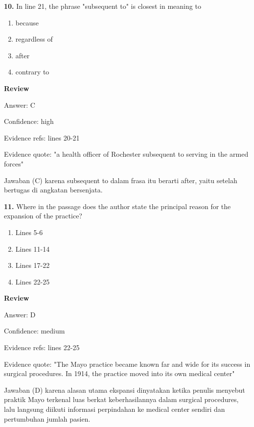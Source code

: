 \documentclass[12pt]{article}
\begin{document}
\endgroup
\par
\vspace{0.25\baselineskip}
\noindent\textbf{10.} In line 21, the phrase "subsequent to" is closest in meaning to
\begin{enumerate}[label=(\Alph*),leftmargin=*,itemsep=0.2em]
\item because
\item regardless of
\item after
\item contrary to
\end{enumerate}
\par
\begingroup
\setlength{\parskip}{0pt}
\setlength{\parindent}{0pt}
\textbf{Review}\par
Answer: C\par
Confidence: high\par
Evidence refs: lines 20-21\par
Evidence quote: "a health officer of Rochester subsequent to serving in the armed forces"\par
Jawaban (C) karena subsequent to dalam frasa itu berarti after, yaitu setelah bertugas di angkatan bersenjata.\par
\endgroup
\par
\vspace{0.25\baselineskip}
\noindent\textbf{11.} Where in the passage does the author state the principal reason for the expansion of the practice?
\begin{enumerate}[label=(\Alph*),leftmargin=*,itemsep=0.2em]
\item Lines 5-6
\item Lines 11-14
\item Lines 17-22
\item Lines 22-25
\end{enumerate}
\par
\begingroup
\setlength{\parskip}{0pt}
\setlength{\parindent}{0pt}
\textbf{Review}\par
Answer: D\par
Confidence: medium\par
Evidence refs: lines 22-25\par
Evidence quote: "The Mayo practice became known far and wide for its success in surgical procedures. In 1914, the practice moved into its own medical center"\par
Jawaban (D) karena alasan utama ekspansi dinyatakan ketika penulis menyebut praktik Mayo terkenal luas berkat keberhasilannya dalam surgical procedures, lalu langsung diikuti informasi perpindahan ke medical center sendiri dan pertumbuhan jumlah pasien.\par
\endgroup
\par
\vspace{0.25\baselineskip}
\end{document}
